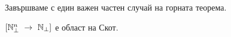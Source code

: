 Завършваме с един важен частен случай на горната теорема.
\begin{framed}
  \begin{corollary}
    $[\mathbb{N}^n_\bot~\to~\mathbb{N}_\bot]$ е област на Скот.
  \end{corollary}
\end{framed}


